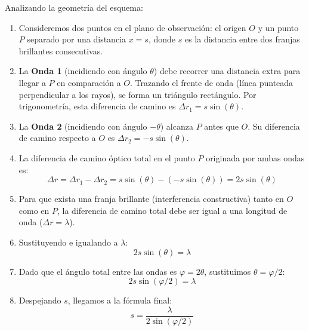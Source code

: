\documentclass[12pt, letterpaper]{article}
\begin{document}
\begin{enumerate}
\begin{center}
		\end{center}
		
		Analizando la geometría del esquema:
		\begin{enumerate}
			\item Consideremos dos puntos en el plano de observación: el origen $O$ y un punto $P$ separado por una distancia $x=s$, donde $s$ es la distancia entre dos franjas brillantes consecutivas.
			\item La \textbf{Onda 1} (incidiendo con ángulo $\theta$) debe recorrer una distancia extra para llegar a $P$ en comparación a $O$. Trazando el frente de onda (línea punteada perpendicular a los rayos), se forma un triángulo rectángulo. Por trigonometría, esta diferencia de camino es $\Delta r_1 = s \sin(\theta)$.
			\item La \textbf{Onda 2} (incidiendo con ángulo $-\theta$) alcanza $P$ antes que $O$. Su diferencia de camino respecto a $O$ es $\Delta r_2 = -s \sin(\theta)$.
			\item La diferencia de camino óptico total en el punto $P$ originada por ambas ondas es:
			$$ \Delta r = \Delta r_1 - \Delta r_2 = s \sin(\theta) - (-s \sin(\theta)) = 2s \sin(\theta) $$
			\item Para que exista una franja brillante (interferencia constructiva) tanto en $O$ como en $P$, la diferencia de camino total debe ser igual a una longitud de onda ($\Delta r = \lambda$).
			\item Sustituyendo e igualando a $\lambda$:
			$$ 2s \sin(\theta) = \lambda $$
			\item Dado que el ángulo total entre las ondas es $\varphi = 2\theta$, sustituimos $\theta = \varphi/2$:
			$$ 2s \sin(\varphi/2) = \lambda $$
			\item Despejando $s$, llegamos a la fórmula final:
			$$ s = \frac{\lambda}{2\sin(\varphi/2)} $$
		\end{enumerate}
		

\end{enumerate}
\end{document}
